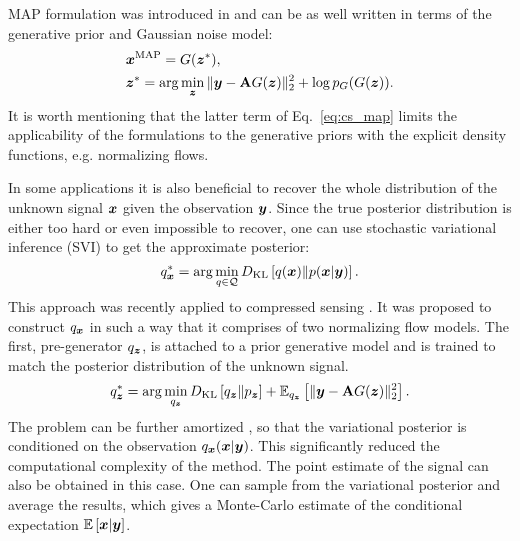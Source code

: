 MAP formulation was introduced in \citet{Whang2021-fj} and can be as well written in terms of the generative prior and Gaussian noise model:
\begin{align}
    &\vx^{\text{MAP}} = G(\vz^*),\\
    &\vz^* = \arg \min_\vz \|\vy - \mathbf{A} G(\vz)\|_2^2 + \log p_{G}(G(\vz)). \label{eq:cs_map}
\end{align}
It is worth mentioning that the latter term of Eq.~\ref{eq:cs_map} limits the applicability of the formulations to the generative priors with the explicit density functions, e.g. normalizing flows.  

In some applications it is also beneficial to recover the whole distribution of the unknown signal ${\bm{x}}$ given the observation ${\bm{y}}$. Since the true posterior distribution is either too hard or even impossible to recover, one can use stochastic variational inference (SVI) to get the approximate posterior:
\begin{equation}
    q_{\bm{x}}^* = \arg\min_{q \in \mathcal{Q}} D_{\mathrm{KL}}\left[q({\bm{x}})\|p({\bm{x}}|{\bm{y}})\right].
\end{equation}
This approach was recently applied to compressed sensing \cite{Whang2021-if}. It was proposed to construct $q_{\bm{x}}$ in such a way that it comprises of two normalizing flow models. The first, pre-generator $q_{\bm{z}}$, is attached to a prior generative model and is trained to match the posterior distribution of the unknown signal. 
\begin{equation}
    q_{\bm{z}}^* = \arg\min_{q_{\bm{z}}} D_{\mathrm{KL}}\left[ q_{\bm{z}}\|p_{\bm{z}}\right] + 
    \mathbb{E}_{q_{\bm{z}}}\left[\|{\bm{y}} - \mathbf{A}G({\bm{z}})\|_2^2 \right].
\end{equation}
The problem can be further amortized \citep{kingma2014autoencoding, rezende2014stochastic}, so that the variational posterior is conditioned on the observation $q_{{\bm{x}}}({\bm{x}}|{\bm{y}})$. This significantly reduced the computational complexity of the method. The point estimate of the signal can also be obtained in this case. One can sample from the variational posterior and average the results, which gives a Monte-Carlo estimate of the conditional expectation $\mathbb{E}\left[{\bm{x}}|{\bm{y}}\right]$.

